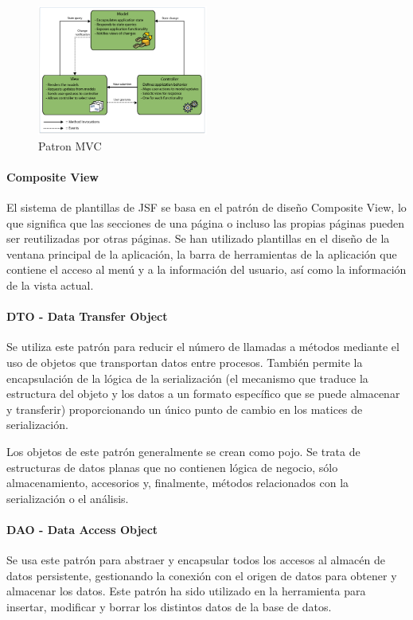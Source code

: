 \begin{figure}[H]
  \centering
  \includegraphics[width=0.50\textwidth]{imaxes/mvc-patron.png}
  \caption{Patron MVC}
  \label{fig:patron-mvc}
\end{figure}




    
\paragraph{Composite View}
El sistema de plantillas de JSF se basa en el patrón de diseño Composite View,
lo que significa que las secciones de una página o incluso las propias páginas pueden ser reutilizadas por otras páginas.
Se han utilizado plantillas en el diseño de la ventana principal de la aplicación, la barra de herramientas de la aplicación que contiene el acceso al menú y a la información del usuario, así como la información de la vista actual.


\paragraph{DTO - Data Transfer Object}
Se utiliza este patrón para reducir el número de llamadas a métodos mediante el uso de objetos que transportan datos entre procesos. También permite la encapsulación de la lógica de la serialización (el mecanismo que traduce la estructura del objeto y los datos a un formato específico que se puede almacenar y transferir) proporcionando un único punto de cambio en los matices de serialización.

Los objetos de este patrón generalmente se crean como \acrlong{pojo}. Se trata de estructuras de datos planas que no contienen lógica de negocio, sólo  almacenamiento, accesorios y, finalmente, métodos relacionados con la serialización o el análisis.


\paragraph{DAO - Data Access Object}
Se usa este patrón para abstraer y encapsular todos los accesos al almacén de datos persistente, gestionando la conexión con el origen de datos para obtener y almacenar los datos. 
Este patrón ha sido utilizado en la herramienta para insertar, modificar y borrar los distintos datos de la base de datos.



